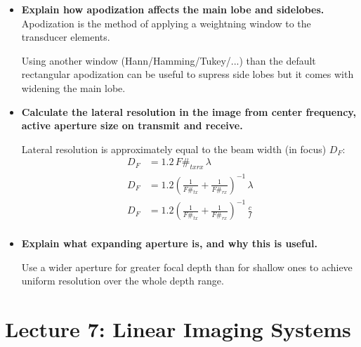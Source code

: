 \documentclass[10pt,a4paper,noendnumber=true]{scrartcl}
\begin{document}
\begin{itemize}


\item \textbf{Explain how apodization affects the main lobe and sidelobes.}
Apodization is the method of applying a weightning window to the transducer elements.

Using another window (Hann/Hamming/Tukey/...) than the default rectangular apodization can be useful to supress side lobes but it comes with widening the main lobe.


\item \textbf{Calculate the lateral resolution in the image from center frequency, active aperture size on transmit and receive.}

Lateral resolution is approximately equal to the beam width (in focus) $D_F$:
\begin{align}
D_F &= 1.2 \, F\#_{txrx} \, \lambda \\
D_F &= 1.2 \left(\frac{1}{F\#_{tx}}+\frac{1}{F\#_{rx}}\right)^{-1} \, \lambda\\
D_F &= 1.2 \left(\frac{1}{F\#_{tx}}+\frac{1}{F\#_{rx}}\right)^{-1} \, \frac{c}{f}\\
\end{align}


\item \textbf{Explain what expanding aperture is, and why this is useful.}

Use a wider aperture for greater focal depth than for shallow ones to achieve uniform resolution over the whole depth range.

\end{itemize}

\newpage
\section{Lecture 7: Linear Imaging Systems}
\end{document}
